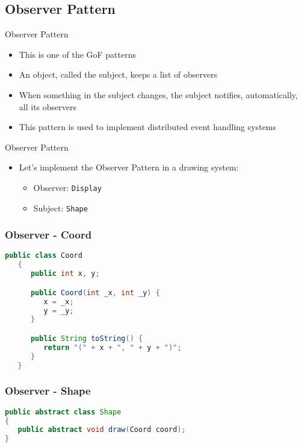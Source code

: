 \documentclass[11pt]{beamer}
\begin{document}
\subsection*{Observer Pattern}
\begin{frame}{Observer Pattern}
\begin{itemize}
   \item This is one of the GoF patterns
   \item An object, called the subject, keeps a list of observers
   \item When something in the subject changes, the subject notifies, automatically, all its observers
   \item This pattern is used to implement distributed event handling systems
\end{itemize}
\end{frame}

\begin{frame}{Observer Pattern}
\begin{itemize}
   \item Let's implement the Observer Pattern in a drawing system:
      \begin{itemize}
         \item Observer: \texttt{Display}
         \item Subject: \texttt{Shape}
      \end{itemize}
\end{itemize}
\end{frame}

\begin{frame}[fragile]
   \frametitle{Observer - Coord}
   {\small
   \begin{lstlisting}[language=java]
   public class Coord
   {
      public int x, y;

      public Coord(int _x, int _y) {
         x = _x;
         y = _y;
      }

      public String toString() {
         return "(" + x + ", " + y + ")";
      }
   }
   \end{lstlisting}}
\end{frame}

\begin{frame}[fragile]
   \frametitle{Observer - Shape}
   {\footnotesize
      \begin{lstlisting}[language=java]
public abstract class Shape
{
   public abstract void draw(Coord coord);
}
      \end{lstlisting}
   }
\end{frame}
\end{document}

